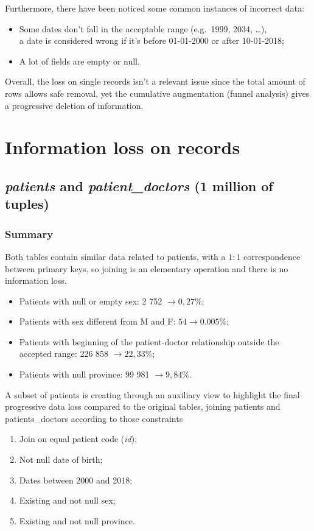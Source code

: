 Furthermore, there have been noticed some common instances of incorrect data:
\begin{itemize}
	\item Some dates don't fall in the acceptable range (e.g.\ 1999, 2034, \dots), \\
	a date is considered wrong if it's before 01-01-2000 or after 10-01-2018;
	\item A lot of fields are empty or null.
\end{itemize}

Overall, the loss on single records isn't a relevant issue since the total amount of rows allows safe removal, yet the cumulative augmentation (funnel analysis) gives a progressive deletion of information.

\section{Information loss on records}

\subsection{\textit{patients} and \textit{patient\_doctors} (1 million of tuples)}
\subsubsection{Summary}
Both tables contain similar data related to patients, with a $1 : 1$ correspondence between primary keys, so joining is an elementary operation and there is no information loss.

\begin{itemize}
	\item Patients with null or empty sex: 2 752 $\rightarrow 0,27\%$;
	\item Patients with sex different from M and F: $54 \rightarrow 0.005\%$;
	\item Patients with beginning of the patient-doctor relationship outside the accepted range: 226 858 $\rightarrow 22,33\%$;
	\item Patients with null province: 99 981 $\rightarrow 9,84\%$.
\end{itemize}

A subset of patients is creating through an auxiliary view to highlight the final progressive data loss compared to the original tables, joining patients and patients\_doctors according to those constraints
\begin{enumerate}
	\item Join on equal patient code (\textit{id});
	\item Not null date of birth;
	\item Dates between 2000 and 2018;
	\item Existing and not null sex;
	\item Existing and not null province.
\end{enumerate}

